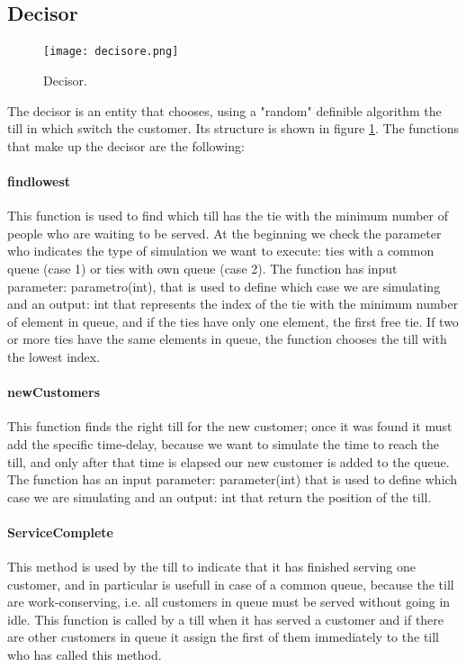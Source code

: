 \subsection{Decisor}
\paragraph{}
\begin{figure}[h]
  \begin{center}
  \texttt{[image: decisore.png]}
  \caption{Decisor.}
  \label{fig:dec}
  \end{center}
\end{figure}
The decisor is an entity that chooses, using a "random" definible algorithm the till in which switch the customer. Its structure is shown in figure \ref{fig:dec}.
The functions that make up the decisor are the following: 
\paragraph{findlowest}
This function is used to find which till has the tie with the minimum number of people who are waiting to be served. At the beginning we check the parameter who indicates the type of simulation we want to execute: ties with a common queue (case 1) or ties with own queue (case 2). The function has input parameter: parametro(int), that is used to define which case we are simulating and an output: int that represents the index of the tie with the minimum number of element in queue, and if the ties have only one element, the first free tie. If two or more ties have the same elements in queue, the function chooses the till with the lowest index.
\paragraph{newCustomers}
This function finds the right till for the new customer; once it was found it must add the specific time-delay, because we want to simulate the time to reach the till, and only after that time is elapsed our new customer is added to the queue.
The function has an input parameter: parameter(int) that is used to define which case we are simulating and an output: int that return the position of the till.
\paragraph{ServiceComplete}
This method is used by the till to indicate that it has finished serving one customer, and in particular is usefull in case of a common queue, because the till are work-conserving, i.e. all customers in queue must be served without going in idle. This function is called by a till when it has served a customer and if there are other customers in queue it assign the first of them immediately to the till who has called this method.
